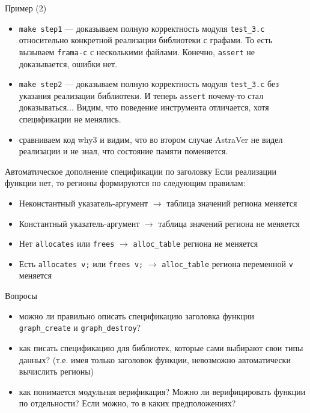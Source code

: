 \documentclass[hyperref={unicode=true}]{beamer}
\begin{document}
    \begin{frame}{Пример (2)}
    \begin{itemize}
    \item \texttt{make step1} --- доказываем полную корректность модуля \texttt{test\_3.c} относительно конкретной реализации библиотеки с графами.
    То есть вызываем \texttt{frama-c} с несколькими файлами. Конечно, \texttt{assert} не доказывается, ошибки нет.
    \item \texttt{make step2} --- доказываем полную корректность модуля \texttt{test\_3.c} без указания реализации библиотеки. И теперь \texttt{assert}
    почему-то стал доказываться... Видим, что поведение инструмента отличается, хотя спецификации не менялись.
    \item сравниваем код why3 и видим, что во втором случае AstraVer не видел реализации и не знал, что состояние памяти поменяется.
    \end{itemize}
    \end{frame}

    \begin{frame}{Автоматическое дополнение спецификации по заголовку}
    Если реализации функции нет, то регионы формируются по следующим правилам:
    \begin{itemize}
    \item Неконстантный указатель-аргумент $\rightarrow$ таблица значений региона меняется
    \item Константный указатель-аргумент $\rightarrow$ таблица значений региона не меняется
    \item Нет \texttt{allocates} или \texttt{frees} $\rightarrow$ \texttt{alloc\_table} региона не меняется
    \item Есть \texttt{allocates v;} или \texttt{frees v;} $\rightarrow$ \texttt{alloc\_table} региона переменной \texttt{v} меняется
    \end{itemize}
    \end{frame}

    \begin{frame}{Вопросы}
    \begin{itemize}
    \item можно ли правильно описать спецификацию заголовка функции \texttt{graph\_create} и \texttt{graph\_destroy}?
    \item как писать спецификацию для библиотек, которые сами выбирают свои типы данных? (т.е. имея только заголовок функции, невозможно автоматически
            вычислить регионы)
    \item как понимается модульная верификация? Можно ли верифицировать функции по отдельности? Если можно, то в каких предположениях?
    \end{itemize}
    \end{frame}
\end{document}
